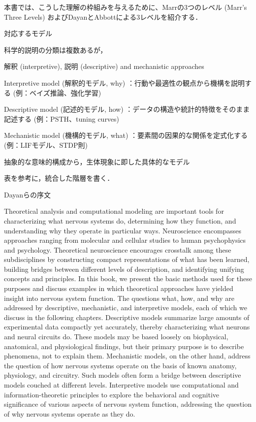 \documentclass[titlepage]{ltjsbook}
\begin{document}
本書では、こうした理解の枠組みを与えるために、Marrの3つのレベル (Marr's Three Levels)  \citep{Marr1982-wk} およびDayanとAbbottによる3レベルを紹介する．

対応するモデル

科学的説明の分類は複数あるが，

解釈 (interpretive), 説明 (descriptive)  and mechanistic approaches


Interpretive model (解釈的モデル, why) ：行動や最適性の観点から機構を説明する (例：ベイズ推論、強化学習) 

Descriptive model (記述的モデル, how) ：データの構造や統計的特徴をそのまま記述する (例：PSTH、tuning curves) 

Mechanistic model (機構的モデル, what) ：要素間の因果的な関係を定式化する (例：LIFモデル、STDP則) 

抽象的な意味的構成から，生体現象に即した具体的なモデル



表を参考に，統合した階層を書く．



Dayanらの序文

Theoretical analysis and computational modeling are important tools for characterizing what nervous systems do, determining how they function, and understanding why they operate in particular ways. Neuroscience encompasses approaches ranging from molecular and cellular studies to human psychophysics and psychology. Theoretical neuroscience encourages crosstalk among these subdisciplines by constructing compact representations of what has been learned, building bridges between different levels of description, and identifying unifying concepts and principles. In this book, we present the basic methods used for these purposes and discuss examples in which theoretical approaches have yielded insight into nervous system function. The questions what, how, and why are addressed by descriptive, mechanistic, and interpretive models, each of which we discuss in the following chapters. Descriptive models summarize large amounts of experimental data compactly yet accurately, thereby characterizing what neurons and neural circuits do. These models may be based loosely on biophysical, anatomical, and physiological findings, but their primary purpose is to describe phenomena, not to explain them. Mechanistic models, on the other hand, address the question of how nervous systems operate on the basis of known anatomy, physiology, and circuitry. Such models often form a bridge between descriptive models couched at different levels. Interpretive models use computational and information-theoretic principles to explore the behavioral and cognitive significance of various aspects of nervous system function, addressing the question of why nervous systems operate as they do.
\end{document}

